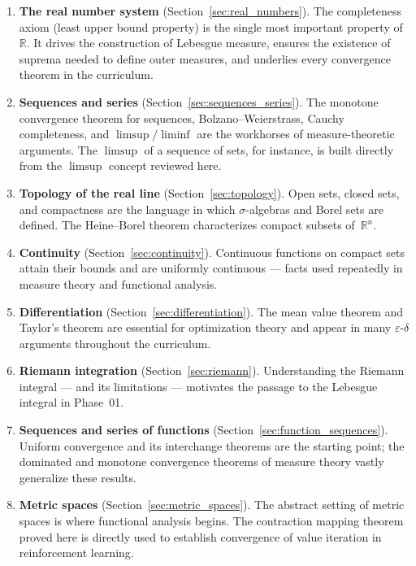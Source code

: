 \documentclass[11pt,a4paper]{article}
\theoremstyle{definition}
\theoremstyle{plain}
\theoremstyle{remark}
\newcommand{\R}{\mathbb{R}}
\begin{document}
\begin{enumerate}[nosep]
    \item \textbf{The real number system} (Section~\ref{sec:real_numbers}). The
    completeness axiom (least upper bound property) is the single most important
    property of~$\R$. It drives the construction of Lebesgue measure, ensures the
    existence of suprema needed to define outer measures, and underlies every
    convergence theorem in the curriculum.

    \item \textbf{Sequences and series} (Section~\ref{sec:sequences_series}). The
    monotone convergence theorem for sequences, Bolzano--Weierstrass, Cauchy
    completeness, and $\limsup/\liminf$ are the workhorses of measure-theoretic
    arguments. The $\limsup$ of a sequence of sets, for instance, is built directly
    from the $\limsup$ concept reviewed here.

    \item \textbf{Topology of the real line} (Section~\ref{sec:topology}). Open sets,
    closed sets, and compactness are the language in which $\sigma$-algebras and Borel
    sets are defined. The Heine--Borel theorem characterizes compact subsets of~$\R^n$.

    \item \textbf{Continuity} (Section~\ref{sec:continuity}). Continuous functions
    on compact sets attain their bounds and are uniformly continuous --- facts used
    repeatedly in measure theory and functional analysis.

    \item \textbf{Differentiation} (Section~\ref{sec:differentiation}). The mean value
    theorem and Taylor's theorem are essential for optimization theory and appear in
    many $\varepsilon$-$\delta$ arguments throughout the curriculum.

    \item \textbf{Riemann integration} (Section~\ref{sec:riemann}). Understanding the
    Riemann integral --- and its limitations --- motivates the passage to the Lebesgue
    integral in Phase~01.

    \item \textbf{Sequences and series of functions}
    (Section~\ref{sec:function_sequences}). Uniform convergence and its interchange
    theorems are the starting point; the dominated and monotone convergence theorems
    of measure theory vastly generalize these results.

    \item \textbf{Metric spaces} (Section~\ref{sec:metric_spaces}). The abstract
    setting of metric spaces is where functional analysis begins. The contraction
    mapping theorem proved here is directly used to establish convergence of value
    iteration in reinforcement learning.
\end{enumerate}
\end{document}
